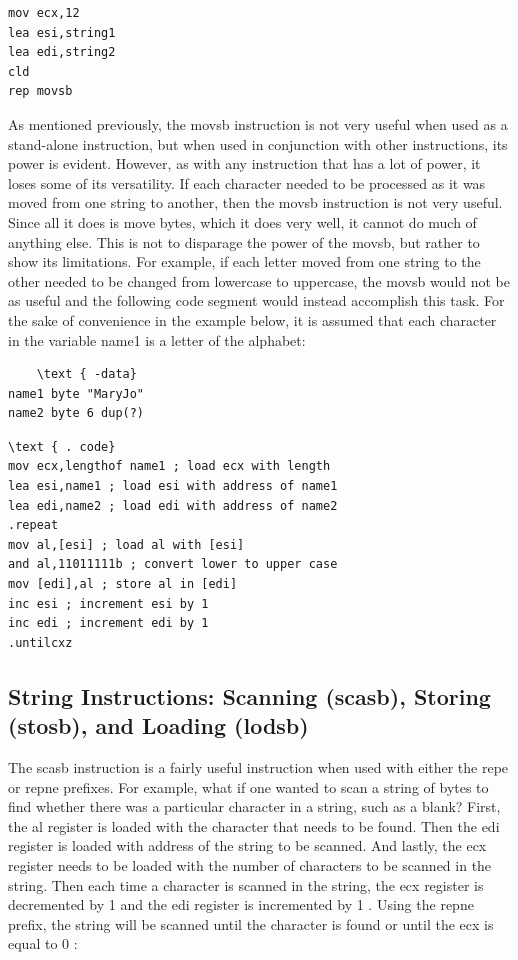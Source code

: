 \documentclass[10pt]{article}
\begin{document}
\begin{verbatim}
mov ecx,12
lea esi,string1
lea edi,string2
cld
rep movsb
\end{verbatim}

As mentioned previously, the movsb instruction is not very useful when used as a stand-alone instruction, but when used in conjunction with other instructions, its power is evident. However, as with any instruction that has a lot of power, it loses some of its versatility. If each character needed to be processed as it was moved from one string to another, then the movsb instruction is not very useful. Since all it does is move bytes, which it does very well, it cannot do much of anything else. This is not to disparage the power of the movsb, but rather to show its limitations. For example, if each letter moved from one string to the other needed to be changed from lowercase to uppercase, the movsb would not be as useful and the following code segment would instead accomplish this task. For the sake of convenience in the example below, it is assumed that each character in the variable name1 is a letter of the alphabet:

\begin{verbatim}
    \text { -data}
name1 byte "MaryJo"
name2 byte 6 dup(?)
\end{verbatim}

\begin{verbatim}
\text { . code}
mov ecx,lengthof name1 ; load ecx with length
lea esi,name1 ; load esi with address of name1
lea edi,name2 ; load edi with address of name2
.repeat
mov al,[esi] ; load al with [esi]
and al,11011111b ; convert lower to upper case
mov [edi],al ; store al in [edi]
inc esi ; increment esi by 1
inc edi ; increment edi by 1
.untilcxz
\end{verbatim}

\subsection*{String Instructions: Scanning (scasb), Storing (stosb), and Loading (lodsb)}
The scasb instruction is a fairly useful instruction when used with either the repe or repne prefixes. For example, what if one wanted to scan a string of bytes to find whether there was a particular character in a string, such as a blank? First, the al register is loaded with the character that needs to be found. Then the edi register is loaded with address of the string to be scanned. And lastly, the ecx register needs to be loaded with the number of characters to be scanned in the string. Then each time a character is scanned in the string, the ecx register is decremented by 1 and the edi register is incremented by 1 . Using the repne prefix, the string will be scanned until the character is found or until the ecx is equal to 0 :
\end{document}
